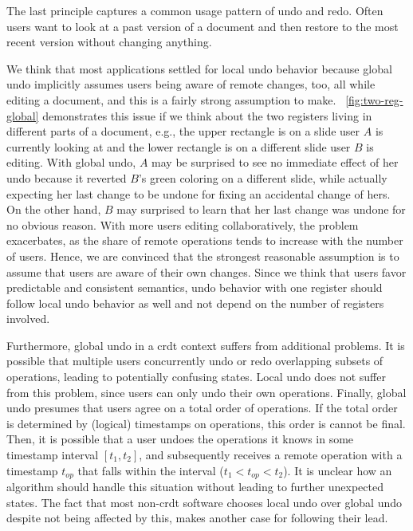 \documentclass[sigplan,natbib=false,review]{acmart}
\begin{document}
The last principle captures a common usage pattern of undo and redo.
Often users want to look at a past version of a document and then restore
to the most recent version without changing anything.


We think that most applications settled for local undo behavior because
global undo implicitly assumes users being aware of remote changes, too,
all while editing a document, and this is a fairly strong assumption to make.
~\ref{fig:two-reg-global} demonstrates this issue
if we think about the two registers living in different parts of a document,
e.g., the upper rectangle is on a slide user $A$ is currently looking at
and the lower rectangle is on a different slide user $B$ is editing.
With global undo, $A$ may be surprised to see no immediate effect of her undo
because it reverted $B$'s green coloring on a different slide,
while actually expecting her last change to be undone for fixing
an accidental change of hers.
On the other hand, $B$ may surprised to learn that her last
change was undone for no obvious reason.
With more users editing collaboratively, the problem exacerbates, as the
share of remote operations tends to increase with the number of users.
Hence, we are convinced that the strongest reasonable assumption is to
assume that users are aware of their own changes.
Since we think that users favor predictable and consistent semantics,
undo behavior with one register should follow local undo behavior as well and
not depend on the number of registers involved.

Furthermore, global undo in a \gls{crdt} context suffers from additional problems.
It is possible that multiple users concurrently undo or redo overlapping subsets
of operations, leading to potentially confusing states.
Local undo does not suffer from this problem, since users can only undo 
their own operations.
Finally, global undo presumes that users agree on a total order of operations.
If the total order is determined by (logical) timestamps on operations,
this order is cannot be final.
Then, it is possible that a user undoes the operations
it knows in some timestamp interval $[t_1, t_2]$, and subsequently receives
a remote operation with a timestamp $t_{op}$ that falls within the
interval ($t_1 < t_{op} < t_2$).
It is unclear how an algorithm should handle this situation without leading
to further unexpected states.
The fact that most non-\gls{crdt} software chooses local undo over global undo
despite not being affected by this, makes another case for following their lead.
\end{document}
